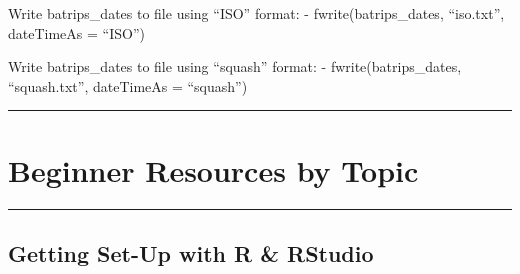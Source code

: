 \documentclass[]{book}
\begin{document}
Write batrips\_dates to file using ``ISO'' format:
- fwrite(batrips\_dates, ``iso.txt'', dateTimeAs = ``ISO'')

Write batrips\_dates to file using ``squash'' format:
- fwrite(batrips\_dates, ``squash.txt'', dateTimeAs = ``squash'')

\begin{center}\rule{0.5\linewidth}{0.5pt}\end{center}

\hypertarget{beginner-resources-by-topic}{%
\section{Beginner Resources by Topic}\label{beginner-resources-by-topic}}

\begin{center}\rule{0.5\linewidth}{0.5pt}\end{center}

\hypertarget{getting-set-up-with-r-rstudio}{%
\subsection{Getting Set-Up with R \& RStudio}\label{getting-set-up-with-r-rstudio}}
\end{document}
